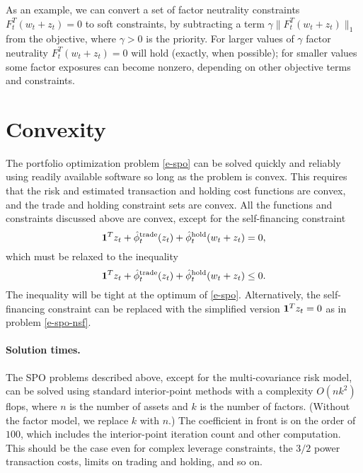 \documentclass[openany]{article}  %
\newcommand{\trcosthat}{\hat \phi^\mathrm{trade}}
\newcommand{\hldcosthat}{\hat \phi^\mathrm{hold}}
\begin{document}
As an example, we can convert a set of factor neutrality constraints
$F_t^T (w_t+z_t)=0$ to soft constraints,
by subtracting a term $\gamma \| F_t^T (w_t+z_t) \|_1$ from the objective,
where $\gamma>0$ is the priority.
For larger values of $\gamma$ factor neutrality $ F_t^T (w_t+z_t)=0$
will hold (exactly, when possible); for smaller
values some factor exposures can become nonzero, depending on other
objective terms and constraints.

\section{Convexity}\label{s-convexity}
The portfolio optimization problem \eqref{e-spo}
can be solved quickly and reliably
using readily available software so long as the problem is convex.
This requires that the risk and estimated transaction
and holding cost functions are convex, and the trade and holding constraint
sets are convex.
All the functions and constraints discussed above are convex,
except for the self-financing constraint
\[
\ones^Tz_t + \trcosthat_t(z_t) + \hldcosthat_t(w_t + z_t) = 0,
\]
which must be relaxed to the inequality
\[
\ones^Tz_t + \trcosthat_t(z_t) + \hldcosthat_t(w_t + z_t) \leq 0.
\]
The inequality will be tight at the optimum of \eqref{e-spo}.
Alternatively, the self-financing constraint can be replaced with the
simplified version $\mathbf 1^Tz_t = 0$ as in problem \eqref{e-spo-nsf}.

\paragraph{Solution times.}
The SPO problems described above, except for the multi-covariance risk model,
can be solved using standard interior-point methods \cite{nesterov1994interior}
with a complexity $O(nk^2)$
flops, where $n$ is the number of assets and $k$ is the number of factors.
(Without the factor model, we replace $k$ with $n$.)
The coefficient in front is on the order of $100$, which includes the
interior-point iteration count and other computation.
This should be the case even for complex leverage constraints,
the $3/2$ power transaction costs, limits on trading and holding, and so on.
\end{document}
